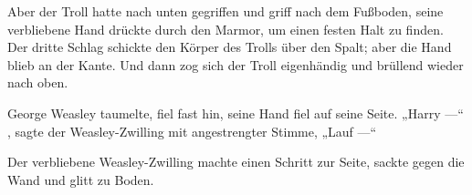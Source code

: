 
Aber der Troll hatte nach unten gegriffen und griff nach dem Fußboden, seine verbliebene Hand drückte durch den Marmor, um einen festen Halt zu finden. Der dritte Schlag schickte den Körper des Trolls über den Spalt; aber die Hand blieb an der Kante. Und dann zog sich der Troll eigenhändig und brüllend wieder nach oben.

George Weasley taumelte, fiel fast hin, seine Hand fiel auf seine Seite.
„Harry —“ , sagte der Weasley-Zwilling mit angestrengter Stimme,
„Lauf —“

Der verbliebene Weasley-Zwilling machte einen Schritt zur Seite, sackte gegen die Wand und glitt zu Boden.

